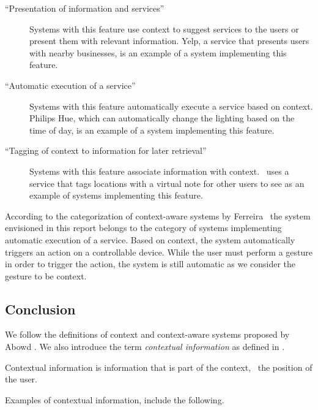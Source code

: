 \begin{description}
\item[{``Presentation of information and services''~\cite[p. 13]{ferreira2014distributed}}]{ Systems with this feature use context to suggest services to the users or present them with relevant information. Yelp, a service that presents users with nearby businesses, is an example of a system implementing this feature.}
\item[{``Automatic execution of a service''~\cite[p. 13]{ferreira2014distributed}}] Systems with this feature automatically execute a service based on context. Philips Hue, which can automatically change the lighting based on the time of day, is an example of a system implementing this feature.
\item[{``Tagging of context to information for later retrieval''~\cite[p. 13]{ferreira2014distributed}}] Systems with this feature associate information with context.~\cite{ferreira2014distributed} uses a service that tags locations with a virtual note for other users to see as an example of systems implementing this feature.
\end{description}

According to the categorization of context-aware systems by Ferreira \etal~the system envisioned in this report belongs to the category of systems implementing automatic execution of a service. Based on context, the system automatically triggers an action on a controllable device. While the user must perform a gesture in order to trigger the action, the system is still automatic as we consider the gesture to be context.

\subsection{Conclusion}

We follow the definitions of context and context-aware systems proposed by Abowd \etal. We also introduce the term \emph{contextual information} as defined in . 

\begin{definition}
\label{def:contextual-information}
Contextual information is information that is part of the context, \eg~the position of the user.
\end{definition}

Examples of contextual information, include the following.

